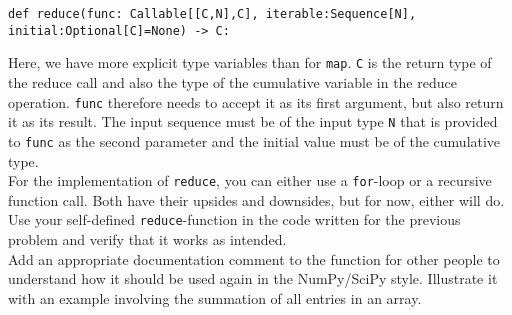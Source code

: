 \documentclass[]{erlangen-problemset}
\begin{document}
\begin{problem}[title={Building our own map and reduce functions}]
\begin{center}
	\texttt{def reduce(func: Callable[[C,N],C], iterable:Sequence[N], initial:Optional[C]=None) -> C:}
\end{center}
Here, we have more explicit type variables than for \texttt{map}. 
\texttt{C} is the return type of the reduce call and also the type of the cumulative variable in the reduce operation. 
\texttt{func} therefore needs to accept it as its first argument, but also return it as its result. 
The input sequence must be of the input type \texttt{N} that is provided to \texttt{func} as the second parameter and the initial value must be of the cumulative type. \\
For the implementation of \texttt{reduce}, you can either use a \texttt{for}-loop or a recursive function call. Both have their upsides and downsides, but for now, either will do. \\
Use your self-defined \texttt{reduce}-function in the code written for the previous problem and verify that it works as intended.\\
Add an appropriate documentation comment to the function for other people to understand how it should be used again in the NumPy/SciPy style. 
Illustrate it with an example involving the summation of all entries in an array.
\end{problem}
\end{document}
